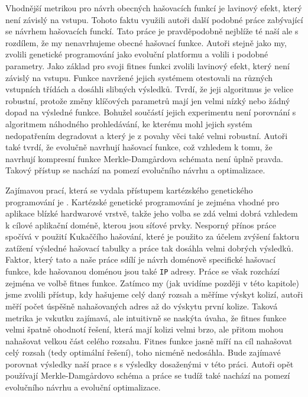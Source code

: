 Vhodnější metrikou pro návrh obecných hašovacích funkcí je lavinový efekt, který 
není závislý na vstupu. Tohoto faktu využili autoři další podobné práce \cite{NCHF_auto_design}
zabývající se návrhem hašovacích funckí. Tato práce je pravděpodobně nejblíže té 
naší ale s rozdílem, že my nenavrhujeme obecné hašovací funkce. Autoři stejně jako my,
zvolili genetické programování jako evoluční platformu a volili i podobné parametry.
Jako základ pro svoji fitnes funkci zvolili lavinový efekt, který není
závislý na vstupu. Funkce navržené jejich systémem otestovali na různých vstupních třídách
a dosáhli slibných výsledků. Tvrdí, že jeji algoritmus je velice robustní, protože změny
klíčových parametrů mají jen velmi nízký nebo žádný dopad na výsledné funkce. Bohužel
součástí jejich experimentu není porovnání s algoritmem náhodného prohledávání, ke 
kterému mohl jejich systém nedopatřením degradovat a který je z povahy věci také 
velmi robustní. Autoři také tvrdí, že evolučně navrhují hašovací funkce, což 
vzhledem k tomu, že navrhují kompresní funkce Merkle-Damg\r{a}rdova schémata
není ůplně pravda. Takový přístup se nachází na pomezí evolučního návrhu a optimalizace.

Zajímavou prací, která se vydala přístupem kartézského genetického programování je
\cite{dobai0}. Kartézské genetické programování je zejména vhodné pro aplikace blízké
hardwarové vrstvě, takže jeho volba se zdá velmi dobrá vzhledem k cílové aplikační doméně,
kterou jsou síťové prvky. Nesporný přínos práce spočívá v použití Kukaččího hašování, které
je použito za účelem zvýšení faktoru zatížení výsledné hašovací tabulky a práce tak dosáhla velmi
dobrých výsledků. Faktor, který tato a naše práce sdílí je návrh doménově specifické hašovací 
funkce, kde hašovanou doménou jsou také \texttt{IP} adresy. Práce se však rozchází zejména ve volbě 
fitnes funkce. Zatímco my (jak uvidíme později v této kapitole) jsme zvolili přístup, kdy hašujeme
celý daný rozsah a měříme výskyt kolizí, autoři měří počet úspěšně nahašovaných adres až do výskytu
první kolize. Taková metrika je vskutku zajímavá, ale intuitivně se naskýta úvaha, že fitnes funkce
velmi špatně ohodnotí řešení, která mají kolizi velmi brzo, ale přitom mohou nahašovat velkou část
celého rozsahu. Fitnes funkce jasně míří na cíl nahašovat celý rozsah (tedy optimální řešení), toho
nicméně nedosáhla. Bude zajímavé porovnat výsledky naší prace s s výsledky dosaženými v této
práci. Autoři opět používají Merkle-Damg\r{a}rdovo schéma a práce se tudíž také nachází na 
pomezí evolučního návrhu a evoluční optimalizace.

